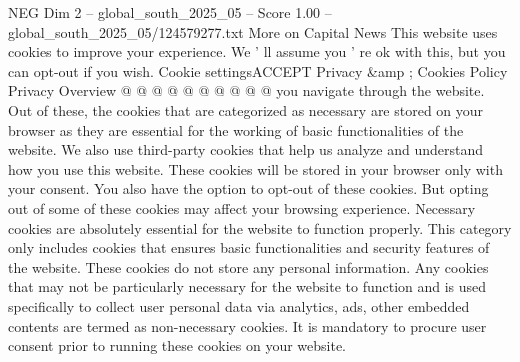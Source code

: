 \begin{textsample}{NEG Dim 2 – global\_south\_2025\_05 – Score 1.00 – global\_south\_2025\_05/124579277.txt}
More on Capital News This website uses cookies to improve your experience.
We ' ll assume you ' re ok with this, but you can opt-out if you wish.
Cookie settingsACCEPT Privacy \&amp ; Cookies Policy Privacy Overview @ @ @ @ @ @ @ @ @ @ you navigate through the website.
Out of these, the cookies that are categorized as necessary are stored on your browser as they are essential for the working of basic functionalities of the website.
We also use third-party cookies that help us analyze and understand how you use this website.
These cookies will be stored in your browser only with your consent.
You also have the option to opt-out of these cookies.
But opting out of some of these cookies may affect your browsing experience.
Necessary cookies are absolutely essential for the website to function properly.
This category only includes cookies that ensures basic functionalities and security features of the website.
These cookies do not store any personal information.
Any cookies that may not be particularly necessary for the website to function and is used specifically to collect user personal data via analytics, ads, other embedded contents are termed as non-necessary cookies.
It is mandatory to procure user consent prior to running these cookies on your website.

\end{textsample}
